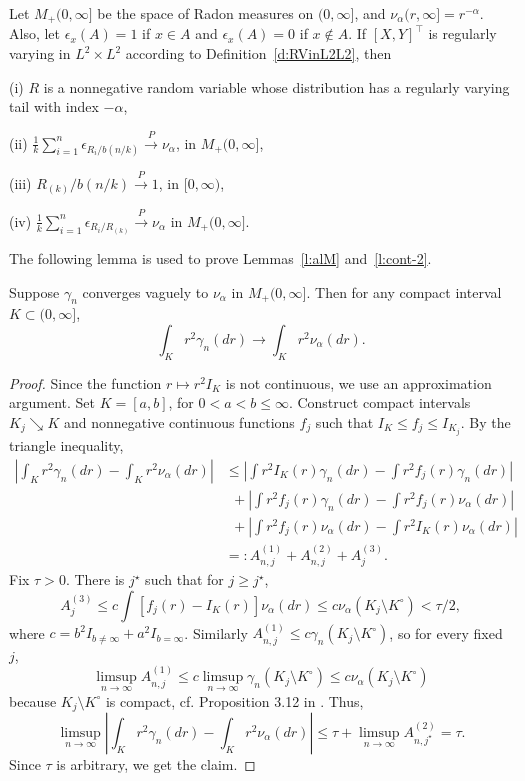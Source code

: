 \documentclass[lineno]{biometrika}
\newcommand \ag{\alpha}
\newcommand \ga{\gamma}
\newcommand \ep{\epsilon}
\newcommand\lb{\left [}
\newcommand\rb{\right ]}
\def\convP{\stackrel{\mbox{$\scriptstyle P$}}{\rightarrow}}
\begin{document}
\begin{lemma} \label{l:R}

Let $M_{+}(0,\infty]$ be the space of Radon measures on $(0,\infty]$, and $\nu_{\ag}(r, \infty] = r^{-\ag}$. Also, let $\ep_x(A) = 1$ if $x \in A$ and $\ep_x(A) = 0$ if $x \notin A$. If $[X,Y]^{\top}$ is regularly varying in $L^2\times L^2$ according to Definition~\ref{d:RVinL2L2}, then

\noindent(i) $R$ is a nonnegative random variable whose distribution has a regularly varying tail with index $-\ag$,

\noindent(ii) $\frac{1}{k} \sum_{i=1}^n \ep_{R_i / b(n/k)} \convP \nu_{\ag}$, in $M_{+}(0,\infty]$,

\noindent(iii) $R_{(k)}/b(n/k) \convP 1$, in $[0,\infty)$,

\noindent(iv) $\frac{1}{k} \sum_{i=1}^n \ep_{R_i / R_{(k)}} \convP \nu_{\ag}$ in $M_{+}(0,\infty]$.

\end{lemma}



The following lemma is used to prove Lemmas~\ref{l:alM} and~\ref{l:cont-2}.

\begin{lemma} \label{l:cont}
Suppose $\ga_n$ converges vaguely to $\nu_\ag$ in $M_+(0,\infty]$. Then for any compact interval $K\subset (0,\infty]$,
\[
\int_K r^2\ga_n(dr) \to \int_K r^2 \nu_\ag(dr).
\]
\end{lemma}

\begin{proof}
Since the function $r\mapsto r^2 I_{K}$ is not continuous,
we use an approximation argument. Set $K= [a, b]$, for $0<a<b \le \infty$. Construct
compact intervals $K_j \searrow K$ and nonnegative continuous functions
$f_j$ such that $I_K \le f_j \le I_{K_j}$. By the triangle inequality,
\begin{align*}
\left | \int_K r^2 \ga_n(dr) - \int_K r^2 \nu_\ag(dr)\right |
&\le  \left | \int r^2 I_K(r) \ga_n(dr) - \int r^2 f_j(r) \ga_n (dr)\right |\\
& \ \ +
\left | \int r^2 f_j(r) \ga_n (dr)  - \int r^2 f_j(r) \nu_\ag  (dr)\right |\\
& \ \ +
\left | \int r^2 f_j(r) \nu_\ag  (dr)  - \int r^2 I_K(r) \nu_\ag(dr)\right |\\
&=: A_{n, j}^{(1)} + A_{n, j}^{(2)} + A_{j}^{(3)}.
\end{align*}
Fix $\tau > 0$. There is $j^\star$ such that for $j \ge j^\star$,
\[
A_{j}^{(3)} \le c\int \lb f_j(r) - I_K(r) \rb \nu_\ag(dr)
\le c \nu_\ag( K_j \setminus K^\circ) < \tau/2,
\]
where $c=b^2I_{b\neq \infty}+a^2I_{b=\infty}$.
Similarly $ A_{n, j}^{(1)} \le c \ga_n ( K_j \setminus K^\circ)$,
so for every fixed $j$,
\[
\limsup_{n\to \infty} A_{n, j}^{(1)} \le c
\limsup_{n\to \infty} \ga_n( K_j \setminus K^\circ)
\le c \nu_\ag( K_j \setminus K^\circ)
\]
because $K_j \setminus K^\circ$ is compact, cf. Proposition 3.12 in
\citet{resnick:1987}. Thus,
\[
\limsup_{n\to\infty}
\left | \int_K r^2 \ga_n(dr) - \int_K r^2 \nu_\ag(dr)\right |
\le  \tau + \limsup_{n\to\infty} A_{n, j^\star}^{(2)} = \tau.
\]
Since $\tau$ is arbitrary, we get the claim.
\end{proof}
\end{document}
